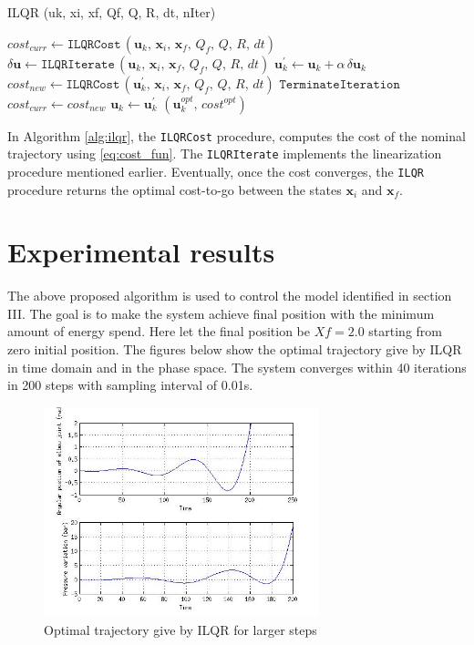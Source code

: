 \documentclass[conference]{IEEEtran}
\newcommand\vx[1]{\mathbf{#1}}
\begin{document}
\begin{algorithm}
\caption{ILQR (uk, xi, xf, Qf, Q, R, dt, nIter)}
\begin{algorithmic}
\label{alg:ilqr}
\STATE $cost_{curr}\leftarrow\texttt{ILQRCost}\,\left(\vx{u}_k,\,\vx{x}_i,\, \vx{x}_f,\,Q_f,\,Q,\,R,\,dt \right)$
\STATE $\delta\vx{u}\leftarrow\texttt{ILQRIterate}\,\left(\vx{u}_k,\,\vx{x}_i,\, \vx{x}_f,\,Q_f,\,Q,\,R,\,dt \right)$
\STATE $\vx{u}_k^{'}\leftarrow \vx{u}_k+\alpha\,\delta\vx{u}_k$
\STATE $cost_{new}\leftarrow\texttt{ILQRCost}\,\left(\vx{u}_k^{'},\,\vx{x}_i,\, \vx{x}_f,\,Q_f,\,Q,\,R,\,dt \right)$
\STATE$\texttt{TerminateIteration}$
\ENDIF
\STATE $cost_{curr}\leftarrow cost_{new}$
\STATE $\vx{u}_{k}\leftarrow \vx{u}_{k}^{'}$
\ENDFOR
\RETURN $\left(\vx{u}_k^{opt},\,cost^{opt}\right)$
\end{algorithmic}
\end{algorithm}
In Algorithm \ref{alg:ilqr}, the \texttt{ILQRCost} procedure, computes the cost of the nominal trajectory using \eqref{eq:cost_fun}. The \texttt{ILQRIterate} implements the linearization procedure mentioned earlier. Eventually, once the cost converges, the \texttt{ILQR} procedure returns the optimal cost-to-go between the states $\vx{x}_{i}$ and $\vx{x}_{f}$.


\section{Experimental results }
The above proposed algorithm is used to control the model identified in section III. The goal is to make the system achieve  final position with the minimum amount of energy spend.  Here let the final position be $Xf = 2.0$ starting from zero initial position. The figures below show the optimal trajectory give by ILQR in time domain and in the phase space. The system  converges within 40 iterations in 200 steps with sampling interval of 0.01s.
\begin{figure}[ht!]
\centering
\includegraphics[width=80mm]{ilqrresponse2.jpg}
\caption{Optimal trajectory give by ILQR for larger steps\label{Optimal trajectory large}}
\end{figure}
\end{document}
